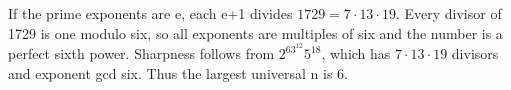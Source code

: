 If the prime exponents are e, each e+1 divides $1729=7\cdot13\cdot19$. Every divisor of 1729 is one modulo six, so all exponents are multiples of six and the number is a perfect sixth power. Sharpness follows from $2^63^{12}5^{18}$, which has $7\cdot13\cdot19$ divisors and exponent gcd six. Thus the largest universal n is $\boxed6$.
